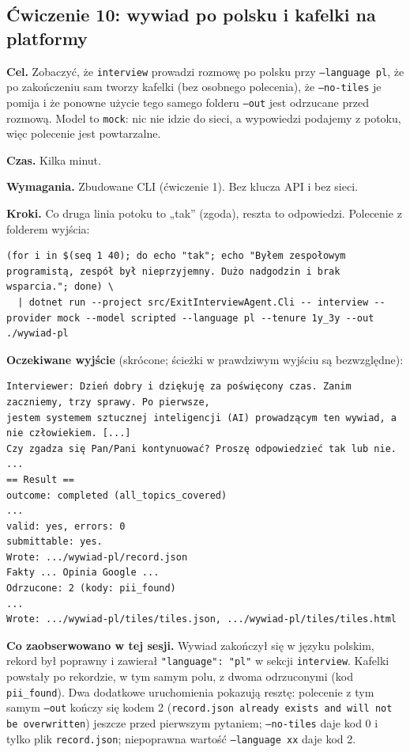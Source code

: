 {\subsection{Ćwiczenie 10: wywiad po polsku i kafelki na platformy}\label{cw:polski}

\textbf{Cel.} Zobaczyć, że \texttt{interview} prowadzi rozmowę po polsku przy
\texttt{--language pl}, że po zakończeniu sam tworzy kafelki (bez osobnego polecenia),
że \texttt{--no-tiles} je pomija i że ponowne użycie tego samego folderu \texttt{--out}
jest odrzucane przed rozmową. Model to \texttt{mock}: nic nie idzie do sieci, a wypowiedzi
podajemy z potoku, więc polecenie jest powtarzalne.

\textbf{Czas.} Kilka minut.

\textbf{Wymagania.} Zbudowane CLI (ćwiczenie 1). Bez klucza API i bez sieci.

\textbf{Kroki.} Co druga linia potoku to „tak” (zgoda), reszta to odpowiedzi.
Polecenie z folderem wyjścia:

\begin{Verbatim}[fontsize=\scriptsize,frame=single,framesep=2mm]
(for i in $(seq 1 40); do echo "tak"; echo "Byłem zespołowym programistą, zespół był nieprzyjemny. Dużo nadgodzin i brak wsparcia."; done) \
  | dotnet run --project src/ExitInterviewAgent.Cli -- interview --provider mock --model scripted --language pl --tenure 1y_3y --out ./wywiad-pl
\end{Verbatim}

\textbf{Oczekiwane wyjście} (skrócone; ścieżki w prawdziwym wyjściu są bezwzględne):

\begin{Verbatim}[fontsize=\scriptsize,frame=single,framesep=2mm]
Interviewer: Dzień dobry i dziękuję za poświęcony czas. Zanim zaczniemy, trzy sprawy. Po pierwsze,
jestem systemem sztucznej inteligencji (AI) prowadzącym ten wywiad, a nie człowiekiem. [...]
Czy zgadza się Pan/Pani kontynuować? Proszę odpowiedzieć tak lub nie.
...
== Result ==
outcome: completed (all_topics_covered)
...
valid: yes, errors: 0
submittable: yes.
Wrote: .../wywiad-pl/record.json
Fakty ... Opinia Google ...
Odrzucone: 2 (kody: pii_found)
...
Wrote: .../wywiad-pl/tiles/tiles.json, .../wywiad-pl/tiles/tiles.html
\end{Verbatim}

\textbf{Co zaobserwowano w tej sesji.} Wywiad zakończył się w języku polskim, rekord był
poprawny i zawierał \texttt{"language": "pl"} w sekcji \texttt{interview}. Kafelki powstały
po rekordzie, w tym samym polu, z dwoma odrzuconymi (kod \texttt{pii\_found}). Dwa dodatkowe
uruchomienia pokazują resztę: polecenie z tym samym \texttt{--out} kończy się
kodem 2 (\texttt{record.json already exists and will not be overwritten}) jeszcze przed pierwszym
pytaniem; \texttt{--no-tiles} daje kod 0 i tylko plik \texttt{record.json}; niepoprawna wartość
\texttt{--language xx} daje kod 2.

}
